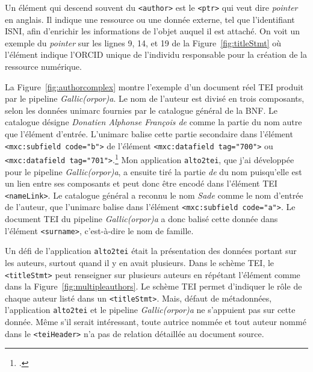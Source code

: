 \documentclass[class=article, crop=false]{standalone}
\begin{document}
\noindent Un élément qui descend souvent du \texttt{<author>} est le \texttt{<ptr>} qui veut dire \textit{pointer} en anglais. Il indique une ressource ou une donnée externe, tel que l'identifiant ISNI, afin d'enrichir les informations de l'objet auquel il est attaché. On voit un exemple du \textit{pointer} sur les lignes 9, 14, et 19 de la Figure~\ref{fig:titleStmt} où l'élément indique l'ORCID unique de l'individu responsable pour la création de la ressource numérique.

La Figure~\ref{fig:authorcomplex} montre l'exemple d'un document réel \acrshort{TEI} produit par le pipeline \textit{Gallic(orpor)a}. Le nom de l'auteur est divisé en trois composants, selon les données \Gls{unimarc} fournies par le catalogue général de la \acrshort{BNF}. Le catalogue désigne \textit{Donatien Alphonse François de} comme la \og{}partie du nom autre que l’élément d’entrée\fg{}. L'\Gls{unimarc} balise cette partie secondaire dans l'élément \texttt{<mxc:subfield code="b">} de l'élément \texttt{<mxc:datafield tag="700">} ou \texttt{<mxc:datafield tag="701">}.\footcite{ManuelUNIMARCFormat} Mon application \texttt{alto2tei}, que j'ai développée pour le pipeline \textit{Gallic(orpor)a}, a ensuite tiré la partie \textit{de} du nom puisqu'elle est un lien entre ses composants et peut donc être encodé dans l'élément \acrshort{TEI} \texttt{<nameLink>}. Le catalogue général a reconnu le nom \textit{Sade} comme le nom d'entrée de l'auteur, que l'\Gls{unimarc} balise dans l'élément \texttt{<mxc:subfield code="a">}. Le document \acrshort{TEI} du pipeline \textit{Gallic(orpor)a} a donc balisé cette donnée dans l'élément \texttt{<surname>}, c'est-à-dire le nom de famille.

Un défi de l'application \texttt{alto2tei} était la présentation des données portant sur les auteurs, surtout quand il y en avait plusieurs. Dans le schème \acrshort{TEI}, le \texttt{<titleStmt>} peut renseigner sur plusieurs auteurs en répétant l'élément comme dans la Figure~\ref{fig:multipleauthors}. Le schème \acrshort{TEI} permet d'indiquer le rôle de chaque auteur listé dans un \texttt{<titleStmt>}. Mais, défaut de métadonnées, l'application \texttt{alto2tei} et le pipeline \textit{Gallic(orpor)a} ne s'appuient pas sur cette donnée. Même s'il serait intéressant, toute autrice nommée et tout auteur nommé dans le \texttt{<teiHeader>} n'a pas de relation détaillée au document source.
\end{document}
